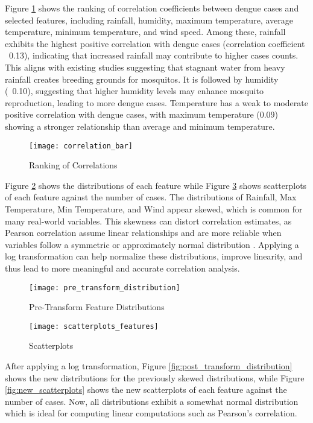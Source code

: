 Figure \ref{fig:correlation_bar} shows the ranking of correlation coefficients between dengue cases and selected features, including rainfall, humidity, maximum temperature, average temperature, minimum temperature, and wind speed. Among these, rainfall exhibits the highest positive correlation with dengue cases (correlation coefficient ~0.13), indicating that increased rainfall may contribute to higher cases counts. This aligns with existing studies suggesting that stagnant water from heavy rainfall creates breeding grounds for mosquitos. It is followed by humidity (~0.10), suggesting that higher humidity levels may enhance mosquito reproduction, leading to more dengue cases. Temperature has a weak to moderate positive correlation with dengue cases, with maximum temperature (0.09) showing a stronger relationship than average and minimum temperature. 

\begin{figure}[hbt!]
	\centering
	\texttt{[image: correlation\_bar]}
	\caption{Ranking of Correlations}
	\label{fig:correlation_bar}
\end{figure}

Figure \ref{fig:pre_transform_distribution} shows the distributions of each feature while Figure \ref{fig:scatterplots_features} shows scatterplots of each feature against the number of cases. The distributions of Rainfall, Max Temperature, Min Temperature, and Wind appear skewed, which is common for many real-world variables. This skewness can distort correlation estimates, as Pearson correlation assume linear relationships and are more reliable when variables follow a symmetric or approximately normal distribution \cite{bobbitt2021pearson}. Applying a log transformation can help normalize these distributions, improve linearity, and thus lead to more meaningful and accurate correlation analysis. 

\begin{figure}[hbt!]
	\centering
	\texttt{[image: pre\_transform\_distribution]}
	\caption{Pre-Transform Feature Distributions}
	\label{fig:pre_transform_distribution}
\end{figure}


\begin{figure}[hbt!]
	\centering
	\texttt{[image: scatterplots\_features]}
	\caption{Scatterplots}
	\label{fig:scatterplots_features}
\end{figure}

After applying a log transformation, Figure \ref{fig:post_transform_distribution} shows the new distributions for the previously skewed distributions, while Figure \ref{fig:new_scatterplots} shows the new scatterplots of each feature against the number of cases. Now, all distributions exhibit a somewhat normal distribution which is ideal for computing linear computations such as Pearson's correlation.

